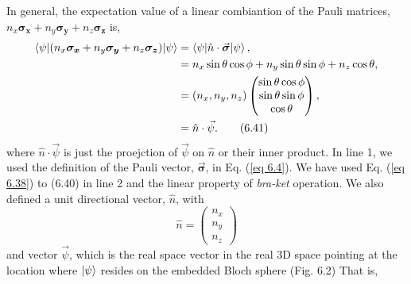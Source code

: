 \documentclass{article}
\begin{document}
In general, the expectation value of a linear combiantion of the Pauli matrices,
$n_x\boldsymbol{\sigma_x}+n_y\boldsymbol{\sigma_y}+n_z\boldsymbol{\sigma_z}$ is,
\begin{align*} \label{eq 6.41}
    \braket{\psi|(n_x\boldsymbol{\sigma_x}+n_y\boldsymbol{\sigma_y}+n_z\boldsymbol{\sigma_z})|\psi}&=\braket{\psi|\hat{n}\cdot\vec{\boldsymbol{\sigma}}|\psi},\\
    &=n_x\sin{\theta}\cos{\phi}+n_y\sin{\theta}\sin{\phi}+n_z\cos{\theta},\\
    &=(n_x,n_y,n_z)\begin{pmatrix}
        \sin{\theta}\cos{\phi}\\
        \sin{\theta}\sin{\phi}\\
        \cos{\theta}
    \end{pmatrix},\\
    &=\hat{n}\cdot\vec{\psi}. \tag{6.41}
\end{align*}
where $\hat{n}\cdot\vec{\psi}$ is just the proejction of $\vec{\psi}$ on $\hat{n}$ or their inner product.
In line 1, we used the definition of the Pauli vector, $\vec{\boldsymbol{\sigma}}$, in Eq. (\ref{eq 6.4}). 
We have used Eq. (\ref{eq 6.38}) to (6.40) in line 2 and the linear property of
\textit{bra-ket} operation. We also defined a unit directional vector, $\hat{n}$, with
\begin{equation}\label{eq 6.42}
    \hat{n}=\begin{pmatrix}
        n_x\\n_y\\n_z
    \end{pmatrix} \tag{6.42}
\end{equation}
and vector $\vec{\psi}$, which is the real space vector in the real 3D space pointing at the
location where $\ket{\psi}$ resides on the embedded Bloch sphere (Fig. 6.2) That is, 
\\
\end{document}
